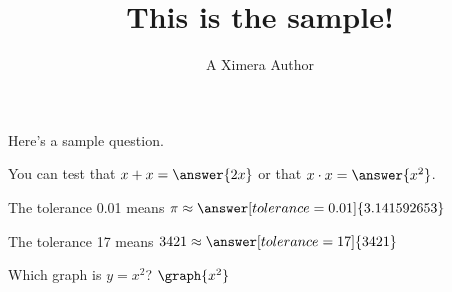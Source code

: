 \documentclass{ximera}
\title{This is the sample!}
\author{A Ximera Author}
\begin{document}
\maketitle

Here's a sample question.

\begin{problem}
\begin{multipleChoice}
\end{multipleChoice}
\end{problem}

\begin{problem}
   You can test that $x + x = \answer{2x}$ or that $x \cdot x = \answer{x^2}$.
\end{problem}

\begin{problem}
   The tolerance 0.01 means $\pi \approx \answer[tolerance=0.01]{3.141592653}$
\end{problem}

\begin{problem}
   The tolerance 17 means $3421 \approx \answer[tolerance=17]{3421}$
\end{problem}

\begin{problem}
    Which graph is $y=x^2$?
    $\graph{x^2}$
\begin{multipleChoice}
\end{multipleChoice}
\end{problem}
\end{document}
